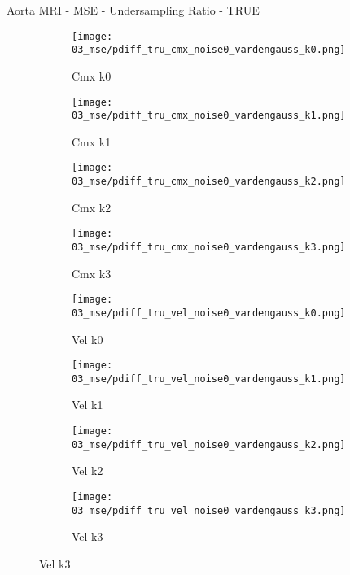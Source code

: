 \documentclass{beamer}
\begin{document}
\begin{frame}{Aorta MRI - MSE - Undersampling Ratio - TRUE}{}
\begin{figure}
\begin{subfigure}{0.24\textwidth}
\texttt{[image: 03\_mse/pdiff\_tru\_cmx\_noise0\_vardengauss\_k0.png]}
\vspace{-20pt}
\caption*{\tiny Cmx k0}
\end{subfigure}
\begin{subfigure}{0.24\textwidth}
\texttt{[image: 03\_mse/pdiff\_tru\_cmx\_noise0\_vardengauss\_k1.png]}
\vspace{-20pt}
\caption*{\tiny Cmx k1}
\end{subfigure}
\begin{subfigure}{0.24\textwidth}
\texttt{[image: 03\_mse/pdiff\_tru\_cmx\_noise0\_vardengauss\_k2.png]}
\vspace{-20pt}
\caption*{\tiny Cmx k2}
\end{subfigure}
\begin{subfigure}{0.24\textwidth}
\texttt{[image: 03\_mse/pdiff\_tru\_cmx\_noise0\_vardengauss\_k3.png]}
\vspace{-20pt}
\caption*{\tiny Cmx k3}
\end{subfigure}

\begin{subfigure}{0.24\textwidth}
\texttt{[image: 03\_mse/pdiff\_tru\_vel\_noise0\_vardengauss\_k0.png]}
\vspace{-20pt}
\caption*{\tiny Vel k0}
\end{subfigure}
\begin{subfigure}{0.24\textwidth}
\texttt{[image: 03\_mse/pdiff\_tru\_vel\_noise0\_vardengauss\_k1.png]}
\vspace{-20pt}
\caption*{\tiny Vel k1}
\end{subfigure}
\begin{subfigure}{0.24\textwidth}
\texttt{[image: 03\_mse/pdiff\_tru\_vel\_noise0\_vardengauss\_k2.png]}
\vspace{-20pt}
\caption*{\tiny Vel k2}
\end{subfigure}
\begin{subfigure}{0.24\textwidth}
\texttt{[image: 03\_mse/pdiff\_tru\_vel\_noise0\_vardengauss\_k3.png]}
\vspace{-20pt}
\caption*{\tiny Vel k3}
\end{subfigure}
\end{figure}
\end{frame}
\end{document}

